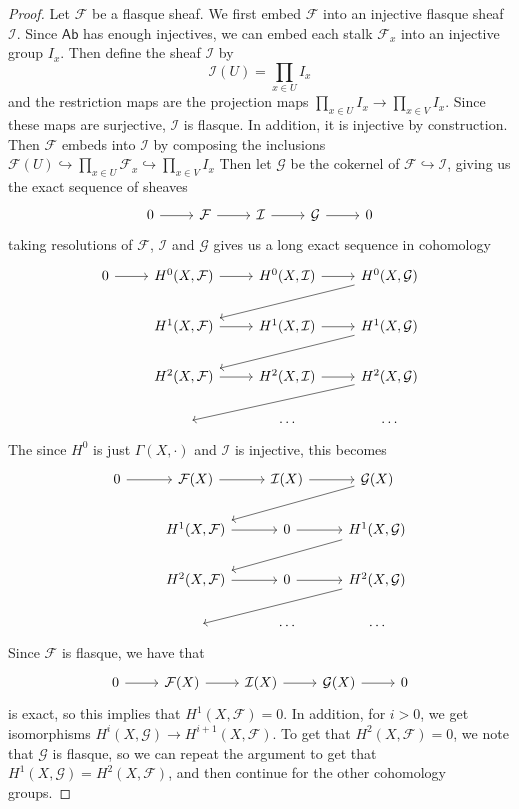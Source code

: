 \begin{proof}
Let $\mathcal{F}$ be a flasque sheaf. We first embed $\mathcal{F}$ into an injective
flasque sheaf $\mathcal{I}$. Since $\mathsf{Ab}$ has enough injectives, we can embed
each stalk $\mathcal{F}_x$ into an injective group $I_x$. Then define the sheaf
$\mathcal{I}$ by
\[
\mathcal{I}(U) = \prod_{x \in U} I_x
\]
and the restriction maps are the projection maps
$\prod_{x \in U} I_x \to \prod_{x \in V} I_x$. Since these maps are surjective,
$\mathcal{I}$ is flasque. In addition, it is injective by construction. Then
$\mathcal{F}$ embeds into $\mathcal{I}$ by composing the inclusions
$\mathcal{F}(U)\hookrightarrow\prod_{x\in U}\mathcal{F}_x\hookrightarrow\prod_{x\in V}I_x$
Then let $\mathcal{G}$ be the cokernel of $\mathcal{F} \hookrightarrow \mathcal{I}$,
giving us the exact sequence of sheaves
\[\begin{tikzcd}
0 \ar[r] & \mathcal{F} \ar[r] & \mathcal{I} \ar[r] & \mathcal{G} \ar[r] & 0
\end{tikzcd}\]
taking resolutions of $\mathcal{F}$, $\mathcal{I}$ and $\mathcal{G}$ gives
us a long exact sequence in cohomology
\[\begin{tikzcd}
0 \ar[r] & H^0(X,\mathcal{F}) \ar[r] & H^0(X,\mathcal{I}) \ar[r]
& H^0(X,\mathcal{G}) \ar[dll] \\
& H^1(X,\mathcal{F}) \ar[r] & H^1(X, \mathcal{I}) \ar[r] & H^1(X,\mathcal{G})\ar[dll] \\
& H^2(X,\mathcal{F}) \ar[r] & H^2(X, \mathcal{I}) \ar[r] & H^2(X,\mathcal{G})\ar[dll] \\
& ~ & \cdots & \cdots
\end{tikzcd}\]
The since $H^0$ is just $\Gamma(X,\cdot)$ and $\mathcal{I}$ is injective, this becomes
\[\begin{tikzcd}
0 \ar[r] & \mathcal{F}(X) \ar[r] & \mathcal{I}(X) \ar[r] & \mathcal{G}(X) \ar[dll] \\
& H^1(X,\mathcal{F}) \ar[r] & 0 \ar[r] & H^1(X,\mathcal{G}) \ar[dll] \\
& H^2(X,\mathcal{F}) \ar[r] & 0 \ar[r] & H^2(X,\mathcal{G}) \ar[dll] \\
& ~ & \cdots & \cdots
\end{tikzcd}\]
Since $\mathcal{F}$ is flasque, we have that
\[\begin{tikzcd}
0 \ar[r] & \mathcal{F}(X) \ar[r] & \mathcal{I}(X) \ar[r] & \mathcal{G}(X) \ar[r] & 0
\end{tikzcd}\]
is exact, so this implies that $H^1(X,\mathcal{F}) = 0$. In addition, for $i > 0$,
we get isomorphisms $H^i(X,\mathcal{G}) \to H^{i+1}(X, \mathcal{F})$. To get that
$H^2(X,\mathcal{F}) = 0$, we note that $\mathcal{G}$ is flasque, so we can
repeat the argument to get that $H^1(X,\mathcal{G}) = H^2(X, \mathcal{F})$, and
then continue for the other cohomology groups.
\end{proof}
